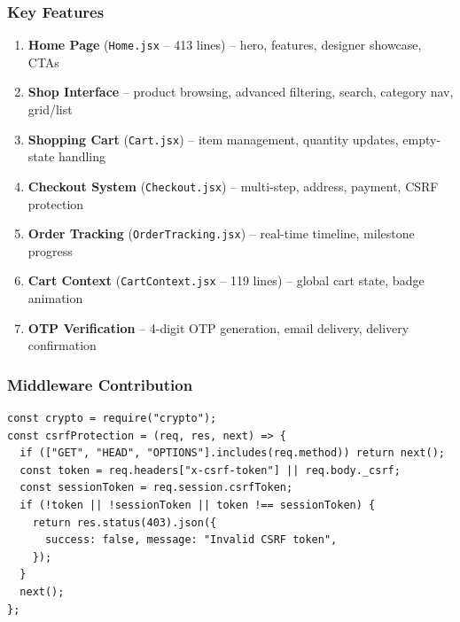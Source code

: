 \documentclass[a4paper,11pt]{article}
\begin{document}
\subsubsection{Key Features}
\begin{enumerate}[noitemsep]
  \item \textbf{Home Page} (\texttt{Home.jsx} -- 413 lines) -- hero, features, designer showcase, CTAs
  \item \textbf{Shop Interface} -- product browsing, advanced filtering, search, category nav, grid/list
  \item \textbf{Shopping Cart} (\texttt{Cart.jsx}) -- item management, quantity updates, empty-state handling
  \item \textbf{Checkout System} (\texttt{Checkout.jsx}) -- multi-step, address, payment, CSRF protection
  \item \textbf{Order Tracking} (\texttt{OrderTracking.jsx}) -- real-time timeline, milestone progress
  \item \textbf{Cart Context} (\texttt{CartContext.jsx} -- 119 lines) -- global cart state, badge animation
  \item \textbf{OTP Verification} -- 4-digit OTP generation, email delivery, delivery confirmation
\end{enumerate}

\subsubsection{Middleware Contribution}
\begin{lstlisting}[caption={CSRF Protection (Hari)}]
const crypto = require("crypto");
const csrfProtection = (req, res, next) => {
  if (["GET", "HEAD", "OPTIONS"].includes(req.method)) return next();
  const token = req.headers["x-csrf-token"] || req.body._csrf;
  const sessionToken = req.session.csrfToken;
  if (!token || !sessionToken || token !== sessionToken) {
    return res.status(403).json({
      success: false, message: "Invalid CSRF token",
    });
  }
  next();
};
\end{lstlisting}
\end{document}
